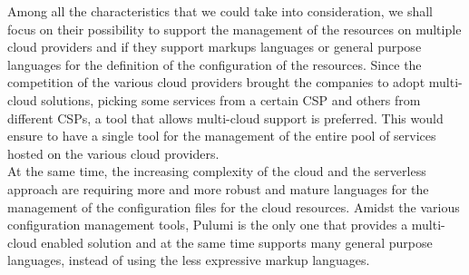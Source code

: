 Among all the characteristics that we could take into consideration, we shall focus on their possibility to support the management of the resources on multiple cloud providers and if they support markups languages or general purpose languages for the definition of the configuration of the resources.
Since the competition of the various cloud providers brought the companies to adopt multi-cloud solutions, picking some services from a certain CSP and others from different CSPs, a tool that allows multi-cloud support is preferred.
This would ensure to have a single tool for the management of the entire pool of services hosted on the various cloud providers.\\
At the same time, the increasing complexity of the cloud and the serverless approach are requiring more and more robust and mature languages for the management of the configuration files for the cloud resources.
Amidst the various configuration management tools, Pulumi is the only one that provides a multi-cloud enabled solution and at the same time supports many general purpose languages, instead of using the less expressive markup languages.\\

